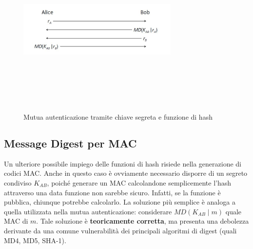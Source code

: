 \begin{figure}
	\begin{center}
	{\includegraphics[height=8cm, width=8cm, keepaspectratio]{Immagini/hash/schema_autenticazione_md.JPG}}
	\caption{Mutua autenticazione tramite chiave segreta e funzione di hash \label{fig:autenticazione_chiave_segreta_hash}}
	\end{center}
\end{figure}

\subsection{Message Digest per MAC}
Un ulteriore possibile impiego delle funzioni di hash risiede nella generazione di codici MAC. Anche in questo caso è ovviamente necessario disporre di un segreto condiviso $K_{AB}$, poiché generare un MAC calcolandone semplicemente l'hash attraverso una data funzione non sarebbe sicuro. Infatti, se la funzione è pubblica, chiunque potrebbe calcolarlo. La soluzione più semplice è analoga a quella utilizzata nella mutua autenticazione: considerare $MD(K_{AB}\mid m)$ quale MAC di $m$. Tale soluzione è \textbf{teoricamente corretta}, ma presenta una debolezza derivante da una comune vulnerabilità dei principali algoritmi di digest (quali MD4, MD5, SHA-1). 

